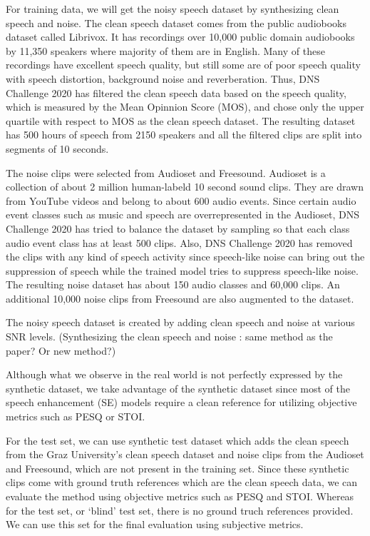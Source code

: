 \documentclass[11pt]{article}
\begin{document}
For training data, we will get the noisy speech dataset by synthesizing clean speech and noise. The clean speech dataset comes from the public audiobooks dataset called Librivox. It has recordings over 10,000 public domain audiobooks by 11,350 speakers where majority of them are in English. Many of these recordings have excellent speech quality, but still some are of poor speech quality with speech distortion, background noise and reverberation. Thus, DNS Challenge 2020 has filtered the clean speech data based on the speech quality, which is measured by the Mean Opinnion Score (MOS), and chose only the upper quartile with respect to MOS as the clean speech dataset. The resulting dataset has 500 hours of speech from 2150 speakers and all the filtered clips are split into segments of 10 seconds.

The noise clips were selected from Audioset and Freesound. Audioset is a collection of about 2 million human-labeld 10 second sound clips. They are drawn from YouTube videos and belong to about 600 audio events. Since certain audio event classes such as music and speech are overrepresented in the Audioset, DNS Challenge 2020 has tried to balance the dataset by sampling so that each class audio event class has at least 500 clips. Also, DNS Challenge 2020 has removed the clips with any kind of speech activity since speech-like noise can bring out the suppression of speech while the trained model tries to suppress speech-like noise. The resulting noise dataset has about 150 audio classes and 60,000 clips. An additional 10,000 noise clips from Freesound are also augmented to the dataset.

The noisy speech dataset is created by adding clean speech and noise at various SNR levels. (Synthesizing the clean speech and noise : same method as the paper? Or new method?)

Although what we observe in the real world is not perfectly expressed by the synthetic dataset, we take advantage of the synthetic dataset since most of the speech enhancement (SE) models require a clean reference for utilizing objective metrics such as PESQ or STOI.

For the test set, we can use synthetic test dataset which adds the clean speech from the Graz University's clean speech dataset and noise clips from the Audioset and Freesound, which are not present in the training set. Since these synthetic clips come with ground truth references which are the clean speech data, we can evaluate the method using objective metrics such as PESQ and STOI. Whereas for the test set, or `blind' test set, there is no ground truch references provided. We can use this set for the final evaluation using subjective metrics.
\end{document}
